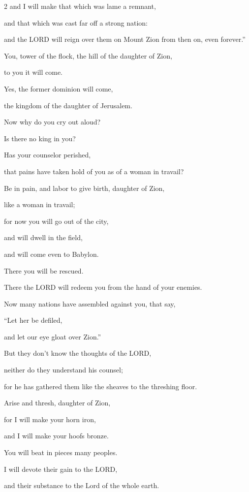 \begin{multicols}{2}
\myverse{}and I will make that which was lame a remnant,

and that which was cast far off a strong nation:

and the LORD will reign over them on Mount Zion from then on, even forever.”

\myverse{}You, tower of the flock, the hill of the daughter of Zion,

to you it will come.

Yes, the former dominion will come,

the kingdom of the daughter of Jerusalem.


\vspace{\baselineskip} \myverse{}Now why do you cry out aloud?

Is there no king in you?

Has your counselor perished,

that pains have taken hold of you as of a woman in travail?

\myverse{}Be in pain, and labor to give birth, daughter of Zion,

like a woman in travail;

for now you will go out of the city,

and will dwell in the field,

and will come even to Babylon.

There you will be rescued.

There the LORD will redeem you from the hand of your enemies.


\vspace{\baselineskip} \myverse{}Now many nations have assembled against you, that say,

“Let her be defiled,

and let our eye gloat over Zion.”

\myverse{}But they don’t know the thoughts of the LORD,

neither do they understand his counsel;

for he has gathered them like the sheaves to the threshing floor.

\myverse{}Arise and thresh, daughter of Zion,

for I will make your horn iron,

and I will make your hoofs bronze.

You will beat in pieces many peoples.

I will devote their gain to the LORD,

and their substance to the Lord of the whole earth.


\end{multicols}
